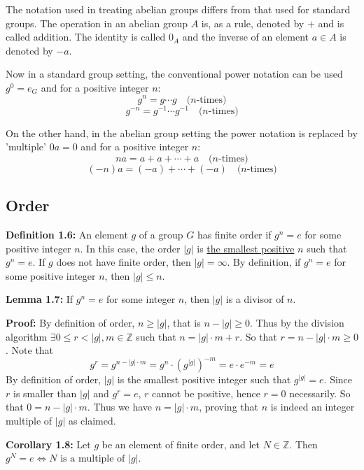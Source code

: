 The notation used in treating abelian groups differs from that used for standard groups. %
The operation in an abelian group $A$ is, as a rule, denoted by $+$ and is called addition. %
The identity is called $0_A$ and the inverse of an element $a \in A$ is denoted by $-a$. %

Now in a standard group setting, the conventional power notation can be used $g^0 = e_G$ and for a positive integer $n$: %
$$g^n = g \cdots g \quad \text{($n$-times)}$$ %
$$g^{-n} = g^{-1} \cdots g^{-1} \quad \text{($n$-times)}$$ %

On the other hand, in the abelian group setting the power notation is replaced by 'multiple' $0a = 0$ and for a positive integer $n$: %
$$na = a + a + \cdots + a \quad \text{($n$-times)}$$ %
$$(-n)a = (-a) + \cdots + (-a) \quad \text{($n$-times)}$$ %

\subsection*{Order} %

\textbf{Definition 1.6:} An element $g$ of a group $G$ has finite order if $g^n = e$ for some positive integer $n$. %
In this case, the order $|g|$ is \underline{the smallest positive} $n$ such that $g^n = e$. %
If $g$ does not have finite order, then $|g| = \infty$. %
By definition, if $g^n = e$ for some positive integer $n$, then $|g| \le n$. %

\textbf{Lemma 1.7:} If $g^n = e$ for some integer $n$, then $|g|$ is a divisor of $n$. %

\textbf{Proof:} By definition of order, $n \ge |g|$, that is $n - |g| \ge 0$. %
Thus by the division algorithm $\exists 0 \le r < |g| , m \in \mathbb{Z}$ such that $n = |g| \cdot m +  r.$ So that $ r = n - |g|\cdot m \ge 0$. %
Note that %
$$g^r = g^{n - |g| \cdot m} = g^n \cdot (g^{|g|})^{-m} = e \cdot e^{-m} = e$$ %
By definition of order, $|g|$ is the smallest positive integer such that $g^{|g|} = e$. %
Since $r$ is smaller than $|g|$ and $g^r = e$, $r$ cannot be positive, hence $r = 0$ necessarily. %
So that $0 = n - |g| \cdot m$. %
Thus we have $n = |g| \cdot m$, proving that $n$ is indeed an integer multiple of $|g|$ as claimed. %

\textbf{Corollary 1.8:} Let $g$ be an element of finite order, and let $N \in \mathbb{Z}$. %
Then $g^N = e \iff N \text{ is a multiple of } |g|$. %

